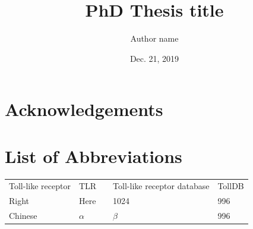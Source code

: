 \documentclass[a4paper,12pt,UTF8,openright]{book}
\title{\Huge \bfseries PhD Thesis title}
\author{Author name}
\date{Dec. 21, 2019}
\begin{document}
\begin{titlepage}
\maketitle
\thispagestyle{empty}
\end{titlepage}

\tableofcontents
\thispagestyle{empty}

\newpage
\thispagestyle{empty}

\frontmatter
\chapter*{Acknowledgements}
\lipsum[1-5]

\chapter*{List of Abbreviations}

\begin{tabular}{p{}p{}||p{}p{}p{}}
	Toll-like receptor & TLR & &Toll-like receptor database & TollDB \\
	Right    & Here      & & 1024 & 996 \\
	Chinese  & $\alpha$  & & $\beta$  & 996 \\
\end{tabular}
\end{document}
